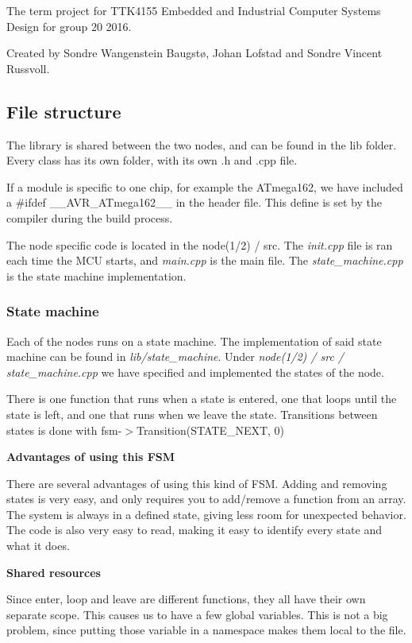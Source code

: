 The term project for T\+T\+K4155 Embedded and Industrial Computer Systems Design for group 20 2016.

Created by Sondre Wangenstein Baugstø, Johan Lofstad and Sondre Vincent Russvoll.

\subsection*{File structure}

The library is shared between the two nodes, and can be found in the lib folder. Every class has its own folder, with its own .h and .cpp file.

If a module is specific to one chip, for example the A\+Tmega162, we have included a {\ttfamily \#ifdef \+\_\+\+\_\+\+A\+V\+R\+\_\+\+A\+Tmega162\+\_\+\+\_\+} in the header file. This define is set by the compiler during the build process.

The node specific code is located in the node(1/2) / src. The {\itshape init.\+cpp} file is ran each time the M\+CU starts, and {\itshape main.\+cpp} is the main file. The {\itshape state\+\_\+machine.\+cpp} is the state machine implementation.

\subsubsection*{State machine}

Each of the nodes runs on a state machine. The implementation of said state machine can be found in {\itshape lib/state\+\_\+machine}. Under {\itshape node(1/2) / src / state\+\_\+machine.\+cpp} we have specified and implemented the states of the node.

There is one function that runs when a state is entered, one that loops until the state is left, and one that runs when we leave the state. Transitions between states is done with {\ttfamily fsm-\/$>$Transition(\+S\+T\+A\+T\+E\+\_\+\+N\+E\+X\+T, 0)}

{\bfseries Advantages of using this F\+SM}

There are several advantages of using this kind of F\+SM. Adding and removing states is very easy, and only requires you to add/remove a function from an array. The system is always in a defined state, giving less room for unexpected behavior. The code is also very easy to read, making it easy to identify every state and what it does.

{\bfseries Shared resources}

Since enter, loop and leave are different functions, they all have their own separate scope. This causes us to have a few global variables. This is not a big problem, since putting those variable in a namespace makes them local to the file.

